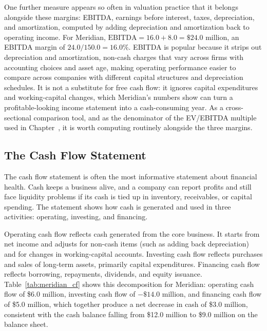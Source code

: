 \documentclass[../ai_in_finance]{subfiles}
\begin{document}
One further measure appears so often in valuation practice that it belongs alongside these margins: EBITDA, earnings before interest, taxes, depreciation, and amortization, computed by adding depreciation and amortization back to operating income. For Meridian, $\text{EBITDA} = 16.0 + 8.0 = \$24.0$ million, an EBITDA margin of $24.0/150.0 = 16.0\%$. EBITDA is popular because it strips out depreciation and amortization, non-cash charges that vary across firms with accounting choices and asset age, making operating performance easier to compare across companies with different capital structures and depreciation schedules.
It is not a substitute for free cash flow: it ignores capital expenditures and working-capital changes, which Meridian's numbers show can turn a profitable-looking income statement into a cash-consuming year. As a cross-sectional comparison tool, and as the denominator of the EV/EBITDA multiple used in Chapter~, it is worth computing routinely alongside the three margins.

\subsection{The Cash Flow Statement}
\label{sec:cash-flow-statement}

The cash flow statement is often the most informative statement about financial health. Cash keeps a business alive, and a company can report profits and still face liquidity problems if its cash is tied up in inventory, receivables, or capital spending. The statement shows how cash is generated and used in three activities: operating, investing, and financing.

Operating cash flow reflects cash generated from the core business. It starts from net income and adjusts for non-cash items (such as adding back depreciation) and for changes in working-capital accounts. Investing cash flow reflects purchases and sales of long-term assets, primarily capital expenditures. Financing cash flow reflects borrowing, repayments, dividends, and equity issuance. Table~\ref{tab:meridian_cf} shows this decomposition for Meridian: operating cash flow of \$6.0 million, investing cash flow of $-\$14.0$ million, and financing cash flow of \$5.0 million, which together produce a net decrease in cash of \$3.0 million, consistent with the cash balance falling from \$12.0 million to \$9.0 million on the balance sheet.
\end{document}
